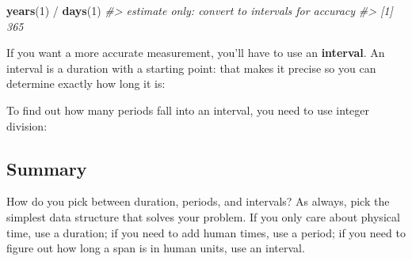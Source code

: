 \documentclass[]{book}
\newenvironment{Shaded}{\begin{snugshade}}{\end{snugshade}}
\newcommand{\KeywordTok}[1]{\textcolor[rgb]{0.13,0.29,0.53}{\textbf{{#1}}}}
\newcommand{\DecValTok}[1]{\textcolor[rgb]{0.00,0.00,0.81}{{#1}}}
\newcommand{\StringTok}[1]{\textcolor[rgb]{0.31,0.60,0.02}{{#1}}}
\newcommand{\CommentTok}[1]{\textcolor[rgb]{0.56,0.35,0.01}{\textit{{#1}}}}
\newcommand{\NormalTok}[1]{{#1}}
\begin{document}
\begin{Shaded}
\begin{Highlighting}[]
\KeywordTok{years}\NormalTok{(}\DecValTok{1}\NormalTok{) /}\StringTok{ }\KeywordTok{days}\NormalTok{(}\DecValTok{1}\NormalTok{)}
\CommentTok{#> estimate only: convert to intervals for accuracy}
\CommentTok{#> [1] 365}
\end{Highlighting}
\end{Shaded}

If you want a more accurate measurement, you'll have to use an
\textbf{interval}. An interval is a duration with a starting point: that
makes it precise so you can determine exactly how long it is:

\begin{Shaded}
\end{Shaded}

To find out how many periods fall into an interval, you need to use
integer division:

\begin{Shaded}
\end{Shaded}

\subsection{Summary}\label{summary-1}

How do you pick between duration, periods, and intervals? As always,
pick the simplest data structure that solves your problem. If you only
care about physical time, use a duration; if you need to add human
times, use a period; if you need to figure out how long a span is in
human units, use an interval.
\end{document}
